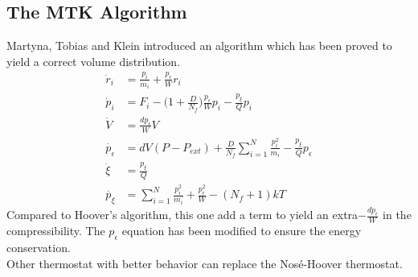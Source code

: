 \documentclass{article}
\begin{document}
\subsection{The MTK Algorithm}
Martyna, Tobias and Klein introduced an algorithm which has been proved to yield a correct volume distribution.
\begin{align}
\dot{r}_i&=\frac{p_i}{m_i}+\frac{p_{\epsilon}}{W}r_i\nonumber\\ 
\dot{p}_i&=F_i-\bigg(1+\frac{D}{N_f}\bigg)\frac{p_{\epsilon}}{W}p_i-\frac{p_{\xi}}{Q}p_i\nonumber\\
\dot{V}&=\frac{dp_{\epsilon}}{W}V\nonumber\\
\dot{p_{\epsilon}}&=dV(P-P_{ext})+\frac{D}{N_f}\sum_{i=1}^{N}\frac{p_i^2}{m_i}-\frac{p_{\xi}}{Q}p_{\epsilon}\\
\dot{\xi}&=\frac{p_{\xi}}{Q}\nonumber\\
\dot{p_{\xi}}&=\sum^N_{i=1}\frac{p_i^2}{m_i}+\frac{p_{\epsilon}^2}{W}-(N_f+1)kT\nonumber
\end{align}
Compared to Hoover's algorithm, this one add a term to yield an extra$-\frac{dp_\epsilon}{W}$ in the compressibility. The $p_\epsilon$ equation has been modified to ensure the energy conservation.\\
Other thermostat with better behavior can replace the Nos\'{e}-Hoover thermostat.
\end{document}
